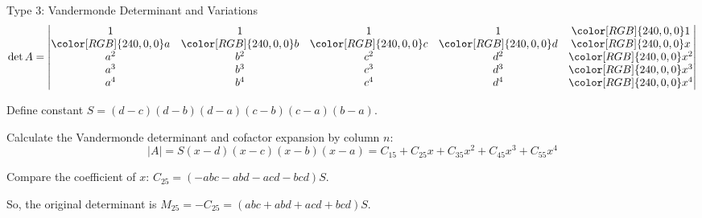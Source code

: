 \documentclass{beamer}
\begin{document}
\begin{frame}{Type 3: Vandermonde Determinant and Variations}
\begin{equation*}
    \det A=\left| \begin{matrix}
        1&		1&		1&		1&		{\color[RGB]{240, 0, 0} 1}\\
        {\color[RGB]{240, 0, 0} a}&		{\color[RGB]{240, 0, 0} b}&		{\color[RGB]{240, 0, 0} c}&		{\color[RGB]{240, 0, 0} d}&		{\color[RGB]{240, 0, 0} x}\\
        a^2&		b^2&		c^2&		d^2&		{\color[RGB]{240, 0, 0} x^2}\\
        a^3&		b^3&		c^3&		d^3&		{\color[RGB]{240, 0, 0} x^3}\\
        a^4&		b^4&		c^4&		d^4&		{\color[RGB]{240, 0, 0} x^4}\\
    \end{matrix} \right|
\end{equation*}

Define constant $S=\left( d-c \right) \left( d-b \right) \left( d-a \right) \left( c-b \right) \left( c-a \right) \left( b-a \right)$.

\vspace{3pt}
Calculate the Vandermonde determinant and cofactor expansion by column $n$:
\vspace{-5pt}
\begin{equation*}
    |A|=S\left( x-d \right) \left( x-c \right) \left( x-b \right) \left( x-a \right) =C_{15}+C_{25}x+C_{35}x^2+C_{45}x^3+C_{55}x^4
\end{equation*}

Compare the coefficient of $x$: $C_{25}=\left( -abc-abd-acd-bcd \right) S$.

\vspace{3pt}
So, the original determinant is $M_{25}=-C_{25}=\left( abc+abd+acd+bcd \right) S$.
\end{frame}
\end{document}
